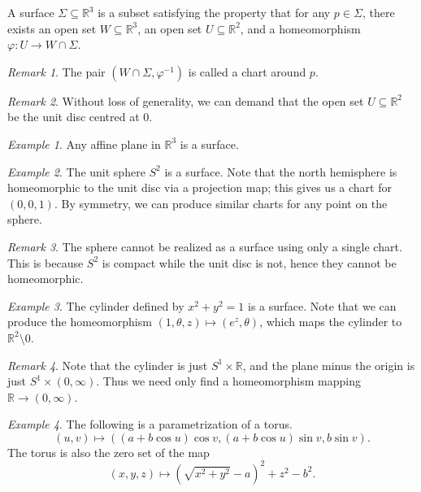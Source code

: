 \documentclass[11pt]{article}
\newcommand{\R}{\mathbb{R}}
\theoremstyle{definition}
\theoremstyle{remark}
\newtheorem*{remark}{Remark}
\newtheorem*{example}{Example}
\numberwithin{equation}{section}
\begin{document}
    \begin{definition}
        A surface $\Sigma \subseteq \R^3$ is a subset satisfying the property that
        for any $p \in \Sigma$, there exists an open set $W \subseteq \R^3$, an
        open set $U \subseteq \R^2$, and a homeomorphism $\varphi\colon U \to W \cap
        \Sigma$.
        \begin{remark}
            The pair $(W\cap \Sigma, \varphi^{-1})$ is called a chart around $p$.
        \end{remark}
        \begin{remark}
            Without loss of generality, we can demand that the open set $U\subseteq
            \R^2$ be the unit disc centred at $0$.
        \end{remark}
    \end{definition}

    \begin{example}
        Any affine plane in $\R^3$ is a surface.
    \end{example}
    \begin{example}
        The unit sphere $S^2$ is a surface. Note that the north hemisphere is
        homeomorphic to the unit disc via a projection map; this gives us a chart for
        $(0, 0, 1)$. By symmetry, we can produce similar charts for any point on the
        sphere.
        \begin{remark}
            The sphere cannot be realized as a surface using only a single chart.
            This is because $S^2$ is compact while the unit disc is not, hence they
            cannot be homeomorphic.
        \end{remark}
    \end{example}
    \begin{example}
        The cylinder defined by $x^2 + y^2 = 1$ is a surface. Note that we can
        produce the homeomorphism $(1, \theta, z) \mapsto (e^z, \theta)$, which maps
        the cylinder to $\R^2\setminus 0$.
        \begin{remark}
            Note that the cylinder is just $S^1\times \R$, and the plane minus the
            origin is just $S^1\times (0, \infty)$. Thus we need only find a
            homeomorphism mapping $\R \to (0, \infty)$.
        \end{remark}
    \end{example}
    \begin{example}
        The following is a parametrization of a torus. \[
            (u, v) \mapsto ((a + b\cos{u})\cos{v}, (a + b\cos{u})\sin{v}, b\sin{v}).
        \] The torus is also the zero set of the map \[
            (x, y, z) \mapsto (\sqrt{x^2 + y^2} - a)^2 + z^2 - b^2.
        \] 
    \end{example}
\end{document}
